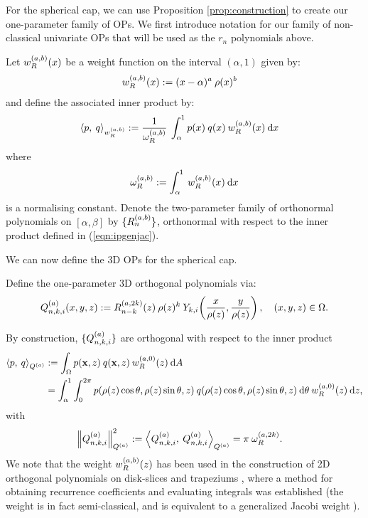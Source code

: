 \documentclass[11pt, oneside]{article}   	%
\begin{document}
For the spherical cap, we can use Proposition \ref{prop:construction} to create our one-parameter family of OPs. We first introduce notation for our family of non-classical univariate OPs that will be used as the $r_n$ polynomials above.
\begin{definition}\label{def:OPconstruction}
	Let $w_R^{(a,b)}(x)$ be a weight function on the interval $(\alpha, 1)$ given by:
\begin{align*}
	w_R^{(a,b)}(x) &:= (x - \alpha)^{a} \: \rho(x)^{b}
\end{align*}
and define the associated inner product by:
\begin{align}
	\ip< p, \: q >_{\genjacw^{(a,b)}} &:= \frac{1}{\normgenjac^{(a,b)}} \: \int_\alpha^1 p(x) \: q(x) \: \genjacw^{(a,b)}(x) \: \D x \label{eqn:ipgenjac}
\end{align}
where
\begin{align}
	\omega_R^{(a,b)} := \int_\alpha^1 \: w_R^{(a,b)}(x) \: {\rm d} x \label{eqn:ipnormalisation}
\end{align}
is a normalising constant.
Denote the two-parameter family of orthonormal polynomials on $[\alpha,\beta]$ by $\{R_n^{(a,b)}\}$, orthonormal with respect to the inner product defined in (\ref{eqn:ipgenjac}).
\end{definition}

We can now define the 3D OPs for the spherical cap.
\begin{definition}\label{def:constuction}
	Define the one-parameter 3D orthogonal polynomials via:
\begin{align}
	\scopnkia(x,y,z) := \genjacnmk^{(a,2k)}(z) \: \rho(z)^k \: \chki\fpr(\frac{x}{\rho(z)}, \frac{y}{\rho(z)}), \quad (x,y,z) \in \Omega.
\end{align}
\end{definition}

By construction, $\{Q_{n,k,i}^{(a)}\}$ are orthogonal with respect to the inner product
\begin{align*}
	\ip< p, \: q >_{\scopa} &:= \int_\Omega p(\xvec, z) \: q(\xvec, z) \: \genjacw^{(a,0)}(z) \: \D A \\
	&= \int_\alpha^1 \int_0^{2\pi} p(\rho(z) \cos\theta, \rho(z) \sin\theta, z) \: q(\rho(z) \cos\theta, \rho(z) \sin\theta, z) \: \D \theta \: \genjacw^{(a,0)}(z) \: \D z,
\end{align*}
with
\begin{align}
	\norm{\scopnkia}_{\scopa}^2 &:= \ip< \scopnkia, \: \scopnkia >_{\scopa} = \pi \: \normgenjac^{(a, 2k)}. \label{eqn:normscop}
\end{align}
We note that the weight $w_R^{(a,b)}(z)$ has been used in the construction of 2D orthogonal polynomials on disk-slices and trapeziums \cite{snowball2019sparse}, where a method for obtaining recurrence coefficients and evaluating integrals was established (the weight is in fact semi-classical, and is equivalent to a generalized Jacobi weight \cite[\S5]{magnus1995painleve}). 
\end{document}
